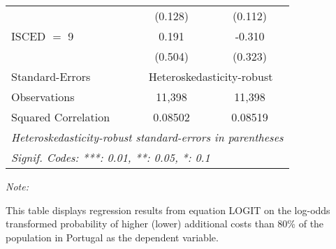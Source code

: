 \begin{table}[htbp!]
\begin{adjustbox}{width = 1\textwidth, max height = 0.95\textheight, center}
\begin{threeparttable}[b]
\begin{tabular}{lcc}
                                 & (0.128)        & (0.112)\\   
            ISCED $=$ 9          & 0.191          & -0.310\\   
                                 & (0.504)        & (0.323)\\   
            \midrule 
            Standard-Errors & \multicolumn{2}{c}{Heteroskedasticity-robust} \\ 
            Observations         & 11,398         & 11,398\\  
            Squared Correlation  & 0.08502        & 0.08519\\  
            \midrule \midrule
            \multicolumn{3}{l}{\emph{Heteroskedasticity-robust standard-errors in parentheses}}\\
            \multicolumn{3}{l}{\emph{Signif. Codes: ***: 0.01, **: 0.05, *: 0.1}}\\
         \end{tabular}
         
         \begin{tablenotes}\item \medskip \textit{Note:}
            \item This table displays regression results from equation LOGIT on the log-odds transformed probability of higher (lower) additional costs than 80\% of the population in Portugal as the dependent variable. 
         \end{tablenotes}
      \end{threeparttable}
   \end{adjustbox}
\end{table}


